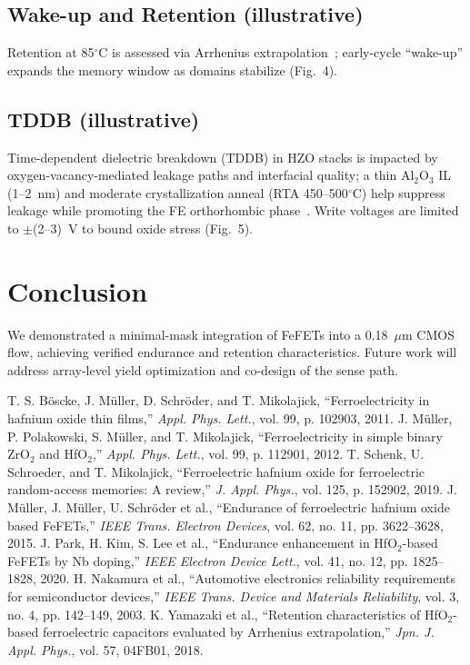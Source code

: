\documentclass[conference]{IEEEtran}
\begin{document}
\subsection{Wake-up and Retention (illustrative)}
Retention at 85$^\circ$C is assessed via Arrhenius extrapolation~\cite{Yamazaki2018}; early-cycle “wake-up” expands the memory window as domains stabilize (Fig.~4).

\subsection{TDDB (illustrative)}
Time-dependent dielectric breakdown (TDDB) in HZO stacks is impacted by oxygen-vacancy-mediated leakage paths and interfacial quality; a thin Al$_2$O$_3$ IL (1--2~nm) and moderate crystallization anneal (RTA 450--500$^\circ$C) help suppress leakage while promoting the FE orthorhombic phase~\cite{Mueller2015,Park2020}. Write voltages are limited to $\pm$(2--3)~V to bound oxide stress (Fig.~5).

\section{Conclusion}
We demonstrated a minimal-mask integration of FeFETs into a 0.18~$\mu$m CMOS flow, achieving verified endurance and retention characteristics. Future work will address array-level yield optimization and co-design of the sense path.

\begin{thebibliography}{8}
T. S. B\"oscke, J. M\"uller, D. Schr\"oder, and T. Mikolajick, ``Ferroelectricity in hafnium oxide thin films,'' \emph{Appl. Phys. Lett.}, vol. 99, p. 102903, 2011.
J. M\"uller, P. Polakowski, S. M\"uller, and T. Mikolajick, ``Ferroelectricity in simple binary ZrO$_2$ and HfO$_2$,'' \emph{Appl. Phys. Lett.}, vol. 99, p. 112901, 2012.
T. Schenk, U. Schroeder, and T. Mikolajick, ``Ferroelectric hafnium oxide for ferroelectric random-access memories: A review,'' \emph{J. Appl. Phys.}, vol. 125, p. 152902, 2019.
J. M\"uller, J. M\"uller, U. Schr\"oder et al., ``Endurance of ferroelectric hafnium oxide based FeFETs,'' \emph{IEEE Trans. Electron Devices}, vol. 62, no. 11, pp. 3622--3628, 2015.
J. Park, H. Kim, S. Lee et al., ``Endurance enhancement in HfO$_2$-based FeFETs by Nb doping,'' \emph{IEEE Electron Device Lett.}, vol. 41, no. 12, pp. 1825--1828, 2020.
H. Nakamura et al., ``Automotive electronics reliability requirements for semiconductor devices,'' \emph{IEEE Trans. Device and Materials Reliability}, vol. 3, no. 4, pp. 142--149, 2003.
K. Yamazaki et al., ``Retention characteristics of HfO$_2$-based ferroelectric capacitors evaluated by Arrhenius extrapolation,'' \emph{Jpn. J. Appl. Phys.}, vol. 57, 04FB01, 2018.
\end{thebibliography}
\end{document}
